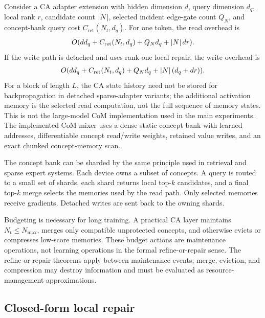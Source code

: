\begin{theorem}
\label{thm:dgm-layer-cost:informal}
Consider a CA adapter extension with hidden dimension $d$, query dimension $d_q$, local rank $r$, candidate count $\left\lvert N\right\rvert$, selected incident edge-gate count $Q_N$, and concept-bank query cost $C_{\mathrm{ret}}(N_t,d_q)$. For one token, the read overhead is
\begin{align*}
O(dd_q+C_{\mathrm{ret}}(N_t,d_q)+Q_N d_q+\left\lvert N\right\rvert dr).
\end{align*}
If the write path is detached and uses rank-one local repair, the write overhead is
\begin{align*}
O(dd_q+C_{\mathrm{ret}}(N_t,d_q)+Q_N d_q+\left\lvert N\right\rvert(d_q+dr)).
\end{align*}
For a block of length $L$, the CA state history need not be stored for backpropagation in detached sparse-adapter variants; the additional activation memory is the selected read computation, not the full sequence of memory states. This is not the large-model CoM implementation used in the main experiments. The implemented CoM mixer uses a dense static concept bank with learned addresses, differentiable concept read/write weights, retained value writes, and an exact chunked concept-memory scan.
\end{theorem}

The concept bank can be sharded by the same principle used in retrieval and sparse expert systems. Each device owns a subset of concepts. A query is routed to a small set of shards, each shard returns local top-$k$ candidates, and a final top-$k$ merge selects the memories used by the read path. Only selected memories receive gradients. Detached writes are sent back to the owning shards.

Budgeting is necessary for long training. A practical CA layer maintains $N_t\le N_{\max}$, merges only compatible unprotected concepts, and otherwise evicts or compresses low-score memories. These budget actions are maintenance operations, not learning operations in the formal refine-or-repair sense. The refine-or-repair theorems apply between maintenance events; merge, eviction, and compression may destroy information and must be evaluated as resource-management approximations.

\subsection{Closed-form local repair}

